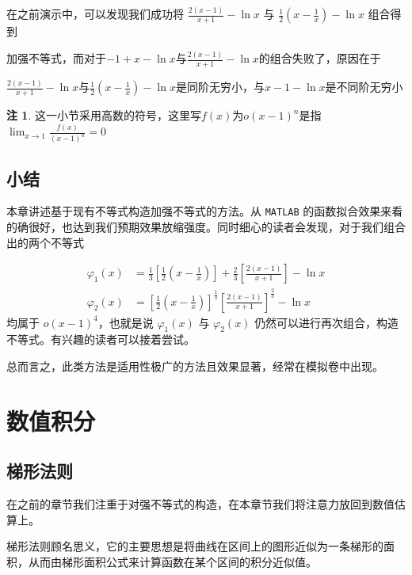 \documentclass[12pt]{article}
\theoremstyle{definition}
\newtheorem{remark}{注}[section]
\theoremstyle{plain}
\theoremstyle{definition}
\begin{document}
在之前演示中，可以发现我们成功将 \(\frac{2(x - 1)}{x + 1} - \ln x\) 与
\(\frac{1}{2}\left( x - \frac{1}{x} \right) - \ln x\) 组合得到

加强不等式，而对于\(- 1 + x - \ln x\)与\(\frac{2(x - 1)}{x + 1} - \ln x\)的组合失败了，原因在于

\(\frac{2(x - 1)}{x + 1} - \ln x\)与\(\frac{1}{2}\left( x - \frac{1}{x} \right) - \ln x\)是同阶无穷小，与\(x - 1 - \ln x\)是不同阶无穷小

\begin{remark}
这一小节采用高数的符号，这里写\(f(x)\)为\(o(x - 1)^n\)是指\(\lim_{x \rightarrow 1}\frac{f(x)}{(x - 1)^{n}} = 0\)
\end{remark}

\subsection{小结}

本章讲述基于现有不等式构造加强不等式的方法。从 \texttt{MATLAB} 的函数拟合效果来看的确很好，也达到我们预期效果放缩强度。同时细心的读者会发现，对于我们组合出的两个不等式

\begin{align*}
\varphi_{1}(x) &= \frac{1}{3}\left\lbrack \frac{1}{2}\left( x - \frac{1}{x} \right) \right\rbrack + \frac{2}{3}\left\lbrack \frac{2(x - 1)}{x + 1} \right\rbrack - \ln x \\
\varphi_{2}(x) &= \left\lbrack \frac{1}{2}\left( x - \frac{1}{x} \right) \right\rbrack^{\frac{1}{3}}\left\lbrack \frac{2(x - 1)}{x + 1} \right\rbrack^{\frac{2}{3}} - \ln x
\end{align*}
均属于 \(o(x - 1)^{4}\)，也就是说 \(\varphi_{1}(x)\) 与 \(\varphi_{2}(x)\) 仍然可以进行再次组合，构造不等式。有兴趣的读者可以接着尝试。

总而言之，此类方法是适用性极广的方法且效果显著，经常在模拟卷中出现。

\section{数值积分}

\subsection{梯形法则}

在之前的章节我们注重于对强不等式的构造，在本章节我们将注意力放回到数值估算上。

梯形法则顾名思义，它的主要思想是将曲线在区间上的图形近似为一条梯形的面积，从而由梯形面积公式来计算函数在某个区间的积分近似值。
\end{document}
